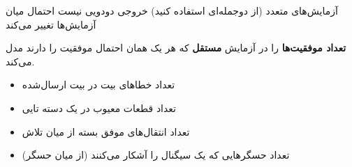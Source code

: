 
\lr{\mbox{\PSno{}}} آزمایش‌های متعدد (از دوجمله‌ای استفاده کنید)\PSbr{}\lr{\mbox{\PSno{}}} خروجی دودویی نیست\PSbr{}\lr{\mbox{\PSno{}}} احتمال میان آزمایش‌ها تغییر می‌کند



\begin{Shaded}
\begin{Highlighting}[]
 \OperatorTok{=} \OperatorTok{;}          
 \OperatorTok{=} \OperatorTok{;}
 \OperatorTok{=} \NormalTok{(}\OperatorTok{,} \OperatorTok{,} \OperatorTok{,} \NormalTok{)}\OperatorTok{;}  

\NormalTok{(}\OperatorTok{,} \NormalTok{(}\NormalTok{)}\OperatorTok{,} \NormalTok{)}\OperatorTok{;}
\NormalTok{(}\OperatorTok{,} \NormalTok{(}\NormalTok{)}\OperatorTok{,} \OperatorTok{*}\NormalTok{(}\OperatorTok{{-}}\NormalTok{))}\OperatorTok{;}
\end{Highlighting}
\end{Shaded}



\textbf{تعداد موفقیت‌ها} را در  آزمایش \textbf{مستقل} که هر یک همان احتمال موفقیت  را دارند مدل می‌کند.


\begin{itemize}
\tightlist
\item
  تعداد خطاهای بیت در  بیت ارسال‌شده
\item
  تعداد قطعات معیوب در یک دسته ‌تایی
\item
  تعداد انتقال‌های موفق بسته از میان  تلاش
\item
  تعداد حسگرهایی که یک سیگنال را آشکار می‌کنند (از میان  حسگر)
\end{itemize}

